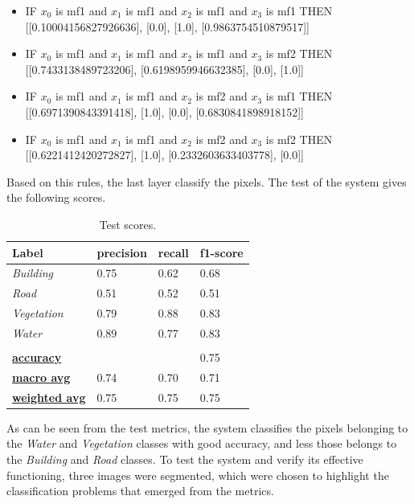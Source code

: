 \documentclass[10pt,twocolumn,letterpaper]{article}
\begin{document}
\begin{itemize}
    \item IF $x_0$ is mf1 and $x_1$ is mf1 and $x_2$ is mf1 and $x_3$ is mf1 THEN [[0.10004156827926636], [0.0], [1.0], [0.9863754510879517]]
    \item IF $x_0$ is mf1 and $x_1$ is mf1 and $x_2$ is mf1 and $x_3$ is mf2 THEN [[0.7433138489723206], [0.6198959946632385], [0.0], [1.0]]
    \item IF $x_0$ is mf1 and $x_1$ is mf1 and $x_2$ is mf2 and $x_3$ is mf1 THEN [[0.6971390843391418], [1.0], [0.0], [0.6830841898918152]]
    \item IF $x_0$ is mf1 and $x_1$ is mf1 and $x_2$ is mf2 and $x_3$ is mf2 THEN [[0.6221412420272827], [1.0], [0.2332603633403778], [0.0]]
\end{itemize}

Based on this rules, the last layer classify the pixels. The test of the system gives the following scores.
\begin{table}[]
\centering
\caption{Test scores.}
\begin{tabular}{|l|l|l|l|}
\hline
\textbf{Label}              & \textbf{precision} & \textbf{recall} & \textbf{f1-score} \\ \hline
\textit{Building}           & 0.75               & 0.62            & 0.68              \\ \hline
\textit{Road}               & 0.51               & 0.52            & 0.51              \\ \hline
\textit{Vegetation}         & 0.79               & 0.88            & 0.83              \\ \hline
\textit{Water}              & 0.89               & 0.77            & 0.83              \\ \hline
                            &                    &                 &                   \\ \hline
{\ul \textbf{accuracy}}     &                    &                 & 0.75              \\ \hline
{\ul \textbf{macro avg}}    & 0.74               & 0.70            & 0.71              \\ \hline
{\ul \textbf{weighted avg}} & 0.75               & 0.75            & 0.75              \\ \hline
\end{tabular}
\end{table}

As can be seen from the test metrics, the system classifies the pixels belonging to the \textit{Water} and \textit{Vegetation} classes with good accuracy, and less those belongs to the \textit{Building} and \textit{Road} classes. To test the system and verify its effective functioning, three images were segmented, which were chosen to highlight the classification problems that emerged from the metrics.
\end{document}
